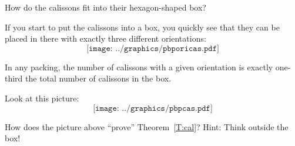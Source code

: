\begin{question} How do the calissons fit into their hexagon-shaped box?
\end{question}

If you start to put the calissons into a box, you quickly see that they can be placed in there with exactly three different orientations:
\[
\texttt{[image: ../graphics/pbporicas.pdf]}
\]
\begin{theorem}\label{T:cal} In any packing, the number of calissons with a given orientation is exactly one-third the total number of calissons in the box.
\end{theorem}

Look at this picture:
\[
\texttt{[image: ../graphics/pbpcas.pdf]}
\]

\begin{question} How does the picture above ``prove'' Theorem~\ref{T:cal}? Hint: Think outside the box!
\end{question}
\QM

